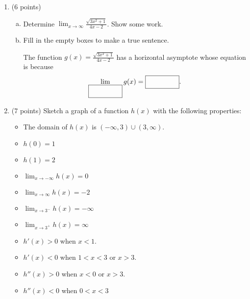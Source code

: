 \documentclass[12pt]{article}
\renewcommand{\emph}[1]{\textsf{\textbf{#1}}}
\newcounter{probcount}
\newcounter{subprobcount}
\newcommand{\problem}[1]{%
\par
\addvspace{4pt}%
\setcounter{subprobcount}{0}%
\stepcounter{probcount}%
\makebox[0pt][r]{\emph{\arabic{probcount}.}\hskip1ex}\emph{[#1 points]}\hskip1ex}
\newenvironment{subproblems}{%
\begin{enumerate}%
\setcounter{enumi}{\value{subprobcount}}%
\renewcommand{\theenumi}{\emph{\alph{enumi}}}}%
{\setcounter{subprobcount}{\value{enumi}}\end{enumerate}}
\newcommand{\ds}{\displaystyle}
\begin{document}
\begin{enumerate}
\item (6 points)
\begin{enumerate}[(a)]
\item Determine $\ds \lim_{x\to\infty} \frac{\sqrt{3x^{2}+1}}{4x-2}$. Show some work.
\vspace{1in}



\item Fill in the empty boxes to make a true sentence.

The function $\ds g(x)= \frac{\sqrt{3x^{2}+1}}{4x-2}$ has a horizontal asymptote whose equation is \fbox{\rule{0pt}{2em}\hspace{2.5cm}} because
\[ \lim_{\fbox{\strut\hspace{1.5cm}}} g(x) = \fbox{\strut\hspace{1.5cm}}.\]

\end{enumerate}

\item (7 points) Sketch a graph of a function $h(x)$ with the following properties:

\begin{multicols}{2}
\begin{itemize}
\item The domain of $h(x)$ is $(-\infty, 3) \cup (3, \infty)$.
\item $h(0)=1$
\item $h(1) = 2$
\item $\ds \lim_{x \to -\infty} h(x) = 0$
\item $\ds \lim_{x \to \infty} h(x) = -2$
\item $\ds \lim_{x \to 3^{-}} h(x) = -\infty$
\columnbreak
\item $\ds \lim_{x \to 3^{+}} h(x) = \infty$
\item $h'(x) > 0$ when $x<1$.
\item $h'(x) < 0$ when $1<x<3$ or $x>3$.
\item $h''(x) > 0$ when $x < 0$ or $x > 3$.
\item $h''(x) < 0$ when $0 < x < 3$

\end{itemize}
\end{multicols}


\end{enumerate}
\end{document}
